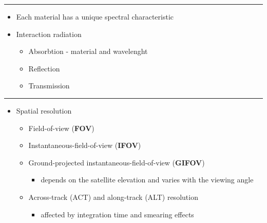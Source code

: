 \documentclass[12pt,preprintnumbers,amsmath,amssymb,nofootinbib,superscriptaddress]{revtex4-1}
\begin{document}
\newpage
{}
\vspace{-0.2cm}
\hrule
\vspace{0.8cm}
\begin{minipage}{0.6\textwidth}
\begin{itemize}
  \item Each material has a unique spectral characteristic
  \item Interaction radiation
  \begin{itemize}
    \item Absorbtion - material and wavelenght
    \item Reflection
    \item Transmission 
  \end{itemize}
\end{itemize}

\end{minipage}
\vspace{\fill}


\newpage
{}
\vspace{-0.2cm}
\hrule
\vspace{0.8cm}
\begin{minipage}{0.6\textwidth}

\begin{itemize}
  \item Spatial resolution
  \begin{itemize}
    \item Field-of-view (\textbf{FOV})
    \item Instantaneous-field-of-view (\textbf{IFOV}) 
    \item Ground-projected instantaneous-field-of-view (\textbf{GIFOV})
    \begin{itemize}
      \item depends on the satellite elevation and varies with the viewing angle
    \end{itemize}
    \item Across-track (ACT) and along-track (ALT) resolution
    \begin{itemize}
      \item affected by integration time and smearing effects
    \end{itemize}
  \end{itemize}
\end{itemize}

\end{minipage}
\vspace{\fill}
\end{document}
